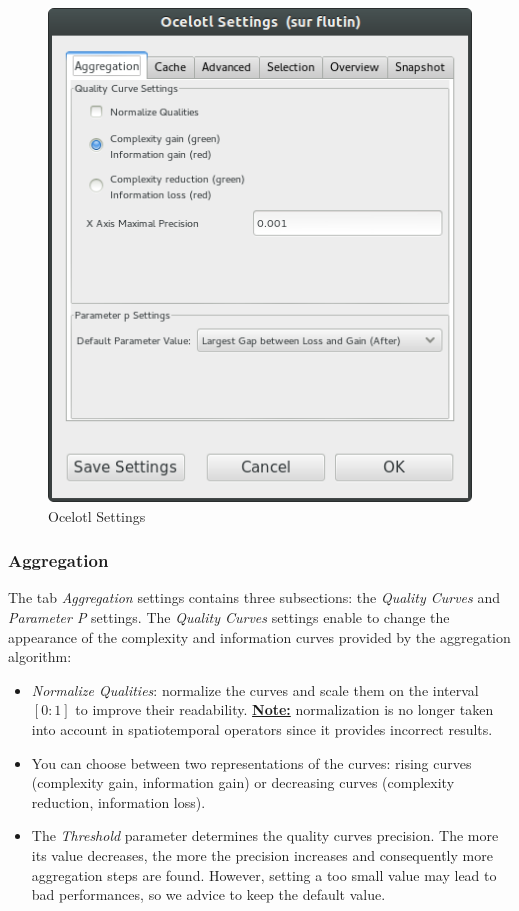 \documentclass[twoside]{article}
\begin{document}
\begin{sloppypar}
\begin{figure}[h!]
	\centering
	\includegraphics[scale=0.5]{images/ocelotlSettings.png}
	\caption{Ocelotl Settings}
	\label{ocelotlsettings}
\end{figure}

\subsubsection{Aggregation}
The tab \textit{Aggregation} settings contains three subsections: the \textit{Quality Curves} and \textit{Parameter P} settings. The \textit{Quality Curves} settings enable to change the appearance of the complexity and information curves provided by the aggregation algorithm:
\begin{itemize}
	\item \textit{Normalize Qualities}: normalize the curves and scale them on the interval $[0:1]$ to improve their readability. \underline{\textbf{Note:}} normalization is no longer taken into account in spatiotemporal operators since it provides incorrect results.
    \item You can choose between two representations of the curves: rising curves (complexity gain, information gain) or decreasing curves (complexity reduction, information loss).
    \item The \textit{Threshold} parameter determines the quality curves precision. The more its value decreases, the more the precision increases and consequently more aggregation steps are found. However, setting a too small value may lead to bad performances, so we advice to keep the default value.
\end{itemize}


\end{sloppypar}
\end{document}
